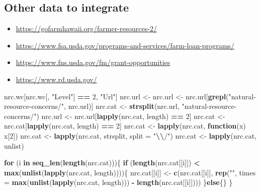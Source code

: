 \documentclass[
]{article}
\newenvironment{Shaded}{\begin{snugshade}}{\end{snugshade}}
\newcommand{\AttributeTok}[1]{\textcolor[rgb]{0.13,0.29,0.53}{#1}}
\newcommand{\ControlFlowTok}[1]{\textcolor[rgb]{0.13,0.29,0.53}{\textbf{#1}}}
\newcommand{\DecValTok}[1]{\textcolor[rgb]{0.00,0.00,0.81}{#1}}
\newcommand{\FunctionTok}[1]{\textcolor[rgb]{0.13,0.29,0.53}{\textbf{#1}}}
\newcommand{\NormalTok}[1]{#1}
\newcommand{\OtherTok}[1]{\textcolor[rgb]{0.56,0.35,0.01}{#1}}
\newcommand{\SpecialCharTok}[1]{\textcolor[rgb]{0.81,0.36,0.00}{\textbf{#1}}}
\newcommand{\StringTok}[1]{\textcolor[rgb]{0.31,0.60,0.02}{#1}}
\providecommand{\tightlist}{%
  \setlength{\itemsep}{0pt}\setlength{\parskip}{0pt}}
\begin{document}
\subsection{Other data to integrate}\label{other-data-to-integrate}

\begin{itemize}
\tightlist
\item
  \url{https://gofarmhawaii.org/farmer-resources-2/}
\item
  \url{https://www.fsa.usda.gov/programs-and-services/farm-loan-programs/}
\item
  \url{https://www.fns.usda.gov/fm/grant-opportunities}
\item
  \url{https://www.rd.usda.gov/}
\end{itemize}

\begin{Shaded}
\begin{Highlighting}[]
\NormalTok{nrc.wc[nrc.wc[, }\StringTok{"Level"}\NormalTok{] }\SpecialCharTok{==} \DecValTok{2}\NormalTok{, }\StringTok{"Url"}\NormalTok{]}
\NormalTok{nrc.url }\OtherTok{\textless{}{-}} 
\NormalTok{nrc.url }\OtherTok{\textless{}{-}}\NormalTok{ nrc.url[}\FunctionTok{grepl}\NormalTok{(}\StringTok{"natural{-}resource{-}concerns/"}\NormalTok{, nrc.url)]}
\NormalTok{nrc.cat }\OtherTok{\textless{}{-}} \FunctionTok{strsplit}\NormalTok{(nrc.url, }\StringTok{"natural{-}resource{-}concerns/"}\NormalTok{)}
\NormalTok{nrc.url }\OtherTok{\textless{}{-}}\NormalTok{ nrc.url[}\FunctionTok{lapply}\NormalTok{(nrc.cat, length) }\SpecialCharTok{==} \DecValTok{2}\NormalTok{]}
\NormalTok{nrc.cat }\OtherTok{\textless{}{-}}\NormalTok{ nrc.cat[}\FunctionTok{lapply}\NormalTok{(nrc.cat, length) }\SpecialCharTok{==} \DecValTok{2}\NormalTok{]}
\NormalTok{nrc.cat }\OtherTok{\textless{}{-}} \FunctionTok{lapply}\NormalTok{(nrc.cat, }\ControlFlowTok{function}\NormalTok{(x) x[}\DecValTok{2}\NormalTok{])}
\NormalTok{nrc.cat }\OtherTok{\textless{}{-}} \FunctionTok{lapply}\NormalTok{(nrc.cat, strsplit, }\AttributeTok{split =} \StringTok{"}\SpecialCharTok{\textbackslash{}\textbackslash{}}\StringTok{/"}\NormalTok{)}
\NormalTok{nrc.cat }\OtherTok{\textless{}{-}} \FunctionTok{lapply}\NormalTok{(nrc.cat, unlist)}

\ControlFlowTok{for}\NormalTok{ (i }\ControlFlowTok{in} \FunctionTok{seq\_len}\NormalTok{(}\FunctionTok{length}\NormalTok{(nrc.cat)))\{}
    \ControlFlowTok{if}\NormalTok{ (}\FunctionTok{length}\NormalTok{(nrc.cat[[i]]) }\SpecialCharTok{\textless{}} \FunctionTok{max}\NormalTok{(}\FunctionTok{unlist}\NormalTok{(}\FunctionTok{lapply}\NormalTok{(nrc.cat, length))))\{}
\NormalTok{        nrc.cat[[i]] }\OtherTok{\textless{}{-}} \FunctionTok{c}\NormalTok{(nrc.cat[[i]], }\FunctionTok{rep}\NormalTok{(}\StringTok{""}\NormalTok{, }\AttributeTok{times =} \FunctionTok{max}\NormalTok{(}\FunctionTok{unlist}\NormalTok{(}\FunctionTok{lapply}\NormalTok{(nrc.cat, length))) }\SpecialCharTok{{-}} \FunctionTok{length}\NormalTok{(nrc.cat[[i]])))}
\NormalTok{    \}}\ControlFlowTok{else}\NormalTok{\{\}}
\NormalTok{\}}


\end{Highlighting}
\end{Shaded}
\end{document}
